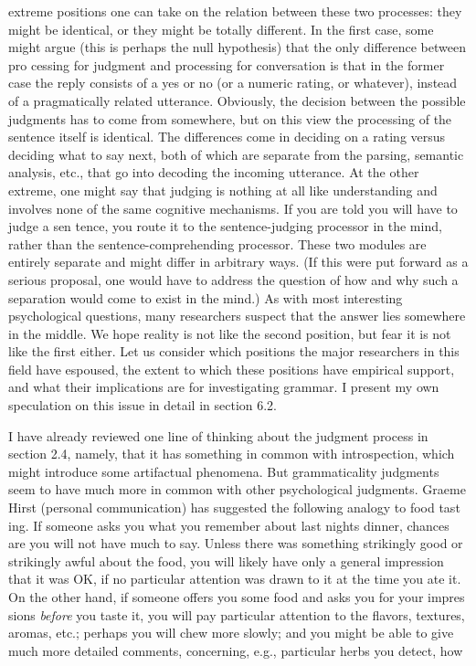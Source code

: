 \begin{styleTextbody}
extreme positions one can take on the relation between these two processes: they might be identical, or they might be totally different. In the first case, some might argue (this is perhaps the null hypothesis) that the only difference between pro\- cessing for judgment and processing for conversation is that in the former case the reply consists of a {\textquotedbl}yes{\textquotedbl} or {\textquotedbl}no{\textquotedbl} (or a numeric rating, or whatever), instead of a pragmatically related utterance. Obviously, the decision between the possible judgments has to come from somewhere, but on this view the processing of the sentence itself is identical. The differences come in deciding on a rating versus deciding what to say next, both of which are separate from the parsing, semantic analysis, etc., that go into decoding the incoming utterance. At the other extreme, one might say that judging is nothing at all like understanding and involves none of the same cognitive mechanisms. If you are told you will have to judge a sen\- tence, you route it to the sentence-judging processor in the mind, rather than the sentence-comprehending processor. These two modules are entirely separate and might differ in arbitrary ways. (If this were put forward as a serious proposal, one would have to address the question of how and why such a separation would come to exist in the mind.) As with most interesting psychological questions, many researchers suspect that the answer lies somewhere in the middle. We hope reality is not like the second position, but fear it is not like the first either. Let us consider which positions the major researchers in this field have espoused, the extent to which these positions have empirical support, and what their implications are for investigating grammar. I present my own speculation on this issue in detail in section 6.2.
\end{styleTextbody}


\begin{styleTextbody}
I have already reviewed one line of thinking about the judgment process in section 2.4, namely, that it has something in common with introspection, which might introduce some artifactual phenomena. But grammaticality judgments seem to have much more in common with other psychological judgments. Graeme Hirst (personal communication) has suggested the following analogy to food tast\- ing. If someone asks you what you remember about last night{\textquotesingle}s dinner, chances are you will not have much to say. Unless there was something strikingly good or strikingly awful about the food, you will likely have only a general impression that it was OK, if no particular attention was drawn to it at the time you ate it. On the other hand, if someone offers you some food and asks you for your impres\- sions \textit{before }you taste it, you will pay particular attention to the flavors, textures, aromas, etc.; perhaps you will chew more slowly; and you might be able to give much more detailed comments, concerning, e.g., particular herbs you detect, how
\end{styleTextbody}


